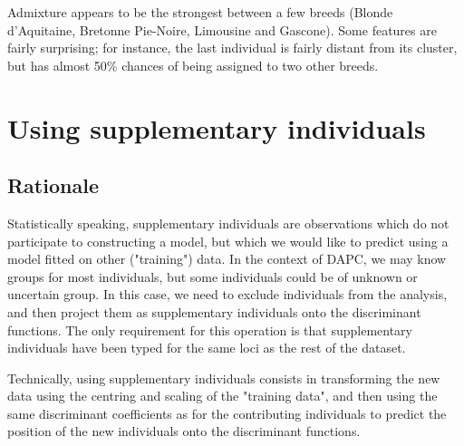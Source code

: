 \documentclass{article}
\begin{document}
\noindent Admixture appears to be the strongest between a few breeds (Blonde d'Aquitaine, Bretonne Pie-Noire,
Limousine and Gascone). Some features are fairly surprising; for instance, the last individual is
fairly distant from its cluster, but has almost 50\% chances of being assigned to two other breeds.






\section{Using supplementary individuals}

\subsection{Rationale}

Statistically speaking, supplementary individuals are observations which do not participate to
constructing a model, but which we would like to predict using a model fitted on other ("training") data.
In the context of DAPC, we may know groups for most individuals, but some individuals could be of
unknown or uncertain group. In this case, we need to exclude individuals from the analysis, and then
project them as supplementary individuals onto the discriminant functions.
The only requirement for this operation is that supplementary individuals have been typed for the
same loci as the rest of the dataset.

Technically, using supplementary individuals consists in transforming the new data using the centring
and scaling of the "training data", and then using the same discriminant coefficients as
for the contributing individuals to predict the position of the new individuals onto the
discriminant functions.


\end{document}
